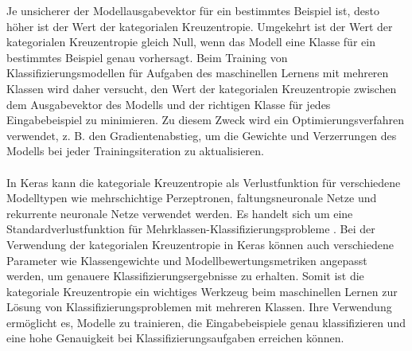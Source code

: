 Je unsicherer der Modellausgabevektor für ein bestimmtes Beispiel ist, desto höher ist der Wert der kategorialen Kreuzentropie. 
Umgekehrt ist der Wert der kategorialen Kreuzentropie gleich Null, wenn das Modell eine Klasse für ein bestimmtes Beispiel genau vorhersagt.
Beim Training von Klassifizierungsmodellen für Aufgaben des maschinellen Lernens mit mehreren Klassen wird daher versucht, den Wert der kategorialen Kreuzentropie zwischen dem Ausgabevektor des Modells und der richtigen Klasse für jedes Eingabebeispiel zu minimieren. 
Zu diesem Zweck wird ein Optimierungsverfahren verwendet, z. B. den Gradientenabstieg, um die Gewichte und Verzerrungen des Modells bei jeder Trainingsiteration zu aktualisieren. \cite{raschka_python_2017}\\\\
In Keras kann die kategoriale Kreuzentropie als Verlustfunktion für verschiedene Modelltypen wie mehrschichtige Perzeptronen, faltungsneuronale Netze und rekurrente neuronale Netze verwendet werden. 
Es handelt sich um eine Standardverlustfunktion für Mehrklassen-Klassifizierungsprobleme \cite{geron_hands-machine_2019}.
Bei der Verwendung der kategorialen Kreuzentropie in Keras können auch verschiedene Parameter wie Klassengewichte und Modellbewertungsmetriken angepasst werden, um genauere Klassifizierungsergebnisse zu erhalten. 
Somit ist die kategoriale Kreuzentropie ein wichtiges Werkzeug beim maschinellen Lernen zur Lösung von Klassifizierungsproblemen mit mehreren Klassen. 
Ihre Verwendung ermöglicht es, Modelle zu trainieren, die Eingabebeispiele genau klassifizieren und eine hohe Genauigkeit bei Klassifizierungsaufgaben erreichen können.

\endinput